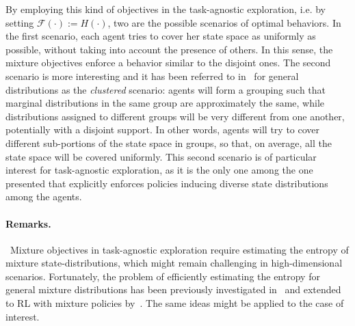 
By employing this kind of objectives in the task-agnostic exploration, i.e. by setting $\mathcal F(\cdot) := H(\cdot)$, two are the possible scenarios of optimal behaviors. In the first scenario, each agent tries to cover her state space as uniformly as possible, without taking into account the presence of others. In this sense, the mixture objectives enforce a behavior similar to the disjoint ones. The second scenario is more interesting and it has been referred to in~\citet{Kolchinsky_2017} for general distributions as the \emph{clustered} scenario: agents will form a grouping such that marginal distributions in the same group are approximately the same, while distributions assigned to different groups will be very different from one another, potentially with a disjoint support. In other words, agents will try to cover different sub-portions of the state space in groups, so that, on average, all the state space will be covered uniformly. This second scenario is of particular interest for task-agnostic exploration, as it is the only one among the one presented that explicitly enforces policies inducing diverse state distributions among the agents.
\vspace{-4pt}
\paragraph*{Remarks.}~Mixture objectives in task-agnostic exploration require estimating the entropy of mixture state-distributions, which might remain challenging in high-dimensional scenarios. Fortunately, the problem of efficiently estimating the entropy for general mixture distributions has been previously investigated in~\citet{Kolchinsky_2017} and extended to RL with mixture policies by~\citet{baram2021maximumentropyreinforcementlearning}. The same ideas might be applied to the case of interest. %


